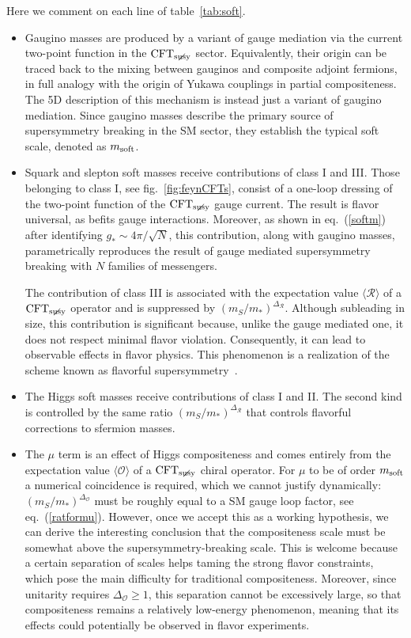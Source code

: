 \documentclass[a4paper,12pt]{article}
\def\eq#1{eq.~(\ref{#1})}
\def\fig#1{fig.~\ref{#1}}
\def\eq#1{eq.~(\ref{#1})}
\def\fig#1{fig.~\ref{#1}}
\def\O{\mathcal{O}}
\def\R{\mathcal{R}}
\def\mst{m_*}
\def\mS{m_S}
\def\msoft{m_{\rm soft}}
\def\CFTs{{\rm CFT}_ {{\rm susy}\! \! \! \! \! \! \! \!\diagup \,\,\,}}
\begin{document}
 Here we comment on each line of table~\ref{tab:soft}.

\begin{itemize}
\item 
Gaugino masses are  produced by a variant of gauge mediation via the current two-point function in the $\CFTs$ sector.  Equivalently, their origin can be traced back to the mixing between gauginos and  composite  adjoint fermions, in full analogy with the origin of Yukawa couplings in partial compositeness.  The 5D description of this mechanism is instead just a variant of gaugino mediation. Since gaugino masses describe the primary source of supersymmetry breaking in the SM sector, they establish the typical soft scale, denoted as $\msoft$.

\item Squark and slepton soft masses receive contributions of class I and III.
Those belonging to class I, see \fig{fig:feynCFTs}, consist of
a one-loop dressing of the two-point function  of the $\CFTs$ gauge current. The result is flavor universal, as befits gauge interactions. Moreover, as shown in \eq{softm} after identifying  $g_*\sim 4\pi/\sqrt N$, this contribution, along with gaugino masses,
parametrically reproduces the result of gauge mediated supersymmetry breaking with $N$ families of messengers.

The contribution of class III
is associated with the expectation value $\langle \R\rangle$ of a $\CFTs$ operator and is suppressed by $(\mS /\mst)^{\Delta_\R} $. Although subleading in size, this contribution is significant because, unlike the gauge mediated one, it does not respect minimal flavor violation. Consequently, it can lead to observable effects in flavor physics. This phenomenon is a realization of the scheme known as flavorful supersymmetry~\cite{Nomura:2007ap}.

\item The  Higgs soft masses receive contributions of class I and II. The second kind is controlled by the same ratio $(\mS /\mst)^{\Delta_\R} $ that controls flavorful corrections to sfermion masses.

\item The $\mu$ term is an effect of Higgs compositeness and comes entirely from the expectation value $\langle \O \rangle$ of a $\CFTs$ chiral operator. For  $\mu$ to be of order $\msoft$ a numerical coincidence is required, which we cannot justify dynamically: $(\mS/\mst)^{\Delta_\O}$ must be roughly equal to a SM gauge loop factor, see \eq{ratformu}. However, once we accept this as a working hypothesis,  we can derive the interesting conclusion that the compositeness scale must be somewhat above the supersymmetry-breaking scale. This is welcome because a certain separation of scales helps taming the strong flavor constraints, which pose the main difficulty for traditional compositeness. Moreover, since unitarity requires ${\Delta_\O}\geq 1$, this separation cannot be excessively large, so that compositeness remains a relatively low-energy phenomenon, meaning that its effects could potentially be observed in flavor experiments.


\end{itemize}
\end{document}
